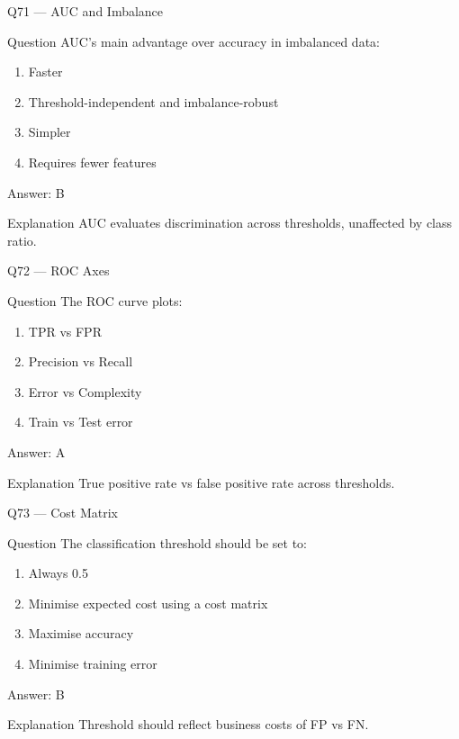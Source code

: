 \documentclass[aspectratio=169,8pt]{beamer}
\begin{document}
	\begin{frame}{Q71 --- AUC and Imbalance}
		\begin{block}{Question}
			AUC's main advantage over accuracy in imbalanced data:
		\end{block}
		\begin{enumerate}
			\item Faster
			\item Threshold-independent and imbalance-robust
			\item Simpler
			\item Requires fewer features
		\end{enumerate}
		\begin{exampleblock}{Answer: B}\end{exampleblock}
		\begin{block}{Explanation}
			AUC evaluates discrimination across thresholds, unaffected by class ratio.
		\end{block}
	\end{frame}
	
	\begin{frame}{Q72 --- ROC Axes}
		\begin{block}{Question}
			The ROC curve plots:
		\end{block}
		\begin{enumerate}
			\item TPR vs FPR
			\item Precision vs Recall
			\item Error vs Complexity
			\item Train vs Test error
		\end{enumerate}
		\begin{exampleblock}{Answer: A}\end{exampleblock}
		\begin{block}{Explanation}
			True positive rate vs false positive rate across thresholds.
		\end{block}
	\end{frame}
	
	\begin{frame}{Q73 --- Cost Matrix}
		\begin{block}{Question}
			The classification threshold should be set to:
		\end{block}
		\begin{enumerate}
			\item Always 0.5
			\item Minimise expected cost using a cost matrix
			\item Maximise accuracy
			\item Minimise training error
		\end{enumerate}
		\begin{exampleblock}{Answer: B}\end{exampleblock}
		\begin{block}{Explanation}
			Threshold should reflect business costs of FP vs FN.
		\end{block}
	\end{frame}
	
\end{document}
